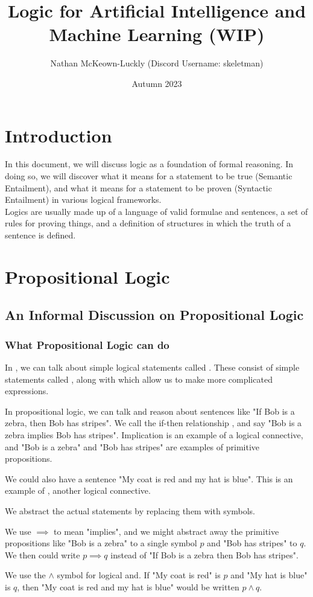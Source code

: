 \documentclass[11pt]{article}
\title{Logic for Artificial Intelligence and Machine Learning (WIP)}
\date{Autumn 2023}
\author{Nathan McKeown-Luckly (Discord Username: skeletman)}
\begin{document}
\maketitle
\tableofcontents
\pagebreak
\section{Introduction}
In this document, we will discuss logic as a foundation of formal reasoning. In doing so, we will discover what it means for a statement to be true (Semantic Entailment), and what it means for a statement to be proven (Syntactic Entailment) in various logical frameworks.
\\ Logics are usually made up of a language of valid formulae and sentences, a set of rules for proving things, and a definition of structures in which the truth of a sentence is defined.
\section{Propositional Logic}
\subsection{An Informal Discussion on Propositional Logic}
\subsubsection{What Propositional Logic can do}
In , we can talk about simple logical statements called . These consist of simple statements called , along with  which allow us to make more complicated expressions.
\begin{eg}
    In propositional logic, we can talk and reason about sentences like "If Bob is a zebra, then Bob has stripes". We call the if-then relationship , and say "Bob is a zebra implies Bob has stripes". Implication is an example of a logical connective, and "Bob is a zebra" and "Bob has stripes" are examples of primitive propositions.
\end{eg}
\begin{eg}
    We could also have a sentence "My coat is red and my hat is blue". This is an example of , another logical connective.
\end{eg}
We abstract the actual statements by replacing them with symbols.
\begin{eg}
    We use $\implies$ to mean "implies", and we might abstract away the primitive propositions like "Bob is a zebra" to a single symbol $p$ and "Bob has stripes" to $q$. We then could write $p \implies q$ instead of "If Bob is a zebra then Bob has stripes".
\end{eg}
\begin{eg}
    We use the $\wedge$ symbol for logical and. If "My coat is red" is $p$ and "My hat is blue" is $q$, then "My coat is red and my hat is blue" would be written $p \wedge q$.
\end{eg}
\pagebreak
\end{document}
